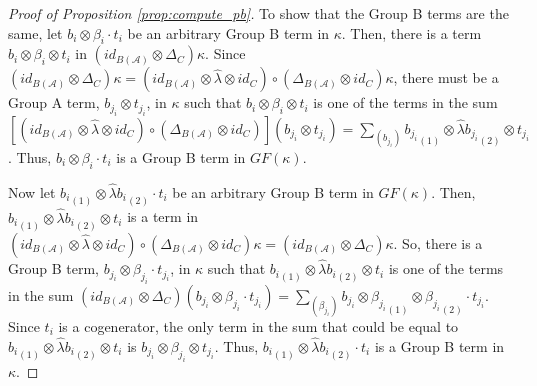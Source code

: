 \begin{proof}[Proof of Proposition \ref{prop:compute_pb}]
To show that the Group B terms 
are the same, let $b_i \otimes \beta_i \cdot t_i$ be 
an arbitrary Group B term in $\kappa$.
Then, there is a term $b_i \otimes \beta_i \otimes t_i$ 
in $(id_{B(\mathcal{A})} \otimes \Delta_{C}) \kappa$. Since 
$(id_{B(\mathcal{A})} \otimes \Delta_{C}) \kappa = 
(id_{B(\mathcal{A})} \otimes \hat{\lambda} \otimes id_C) \circ 
(\Delta_{B(\mathcal{A})} \otimes id_C) \kappa$, 
there must be a Group A term, $b_{j_i} \otimes t_{j_i}$, 
in $\kappa$ such that $b_i \otimes \beta_i \otimes t_i$ 
is one of the terms in the sum 
$[(id_{B(\mathcal{A})} \otimes \hat{\lambda} \otimes id_C) \circ 
(\Delta_{B(\mathcal{A})} \otimes id_C)] (b_{j_i} \otimes t_{j_i}) = 
\sum \limits_{(b_{j_i})} {b_{j_i}}_{(1)} \otimes 
\hat{\lambda} {b_{j_i}}_{(2)} \otimes t_{j_i}$. Thus, 
$b_i \otimes \beta_i \cdot t_i$ is a Group B term in 
$GF(\kappa)$. 

Now let ${b_i}_{(1)} \otimes \hat{\lambda} {b_i}_{(2)} 
\cdot t_i$ be an arbitrary Group B term in $GF(\kappa)$. 
Then, ${b_i}_{(1)} \otimes \hat{\lambda} {b_i}_{(2)} \otimes t_i$ 
is a term in 
$(id_{B(\mathcal{A})} \otimes \hat{\lambda} \otimes id_C) \circ 
(\Delta_{B(\mathcal{A})} \otimes id_C) \kappa = 
(id_{B(\mathcal{A})} \otimes \Delta_{C}) \kappa 
$. So, there is a Group B term, $b_{j_i} \otimes 
\beta_{j_i} \cdot t_{j_i}$, in $\kappa$ such that 
${b_i}_{(1)} \otimes \hat{\lambda} {b_i}_{(2)} 
\otimes t_i$ is one of the terms in the sum 
$(id_{B(\mathcal{A})} \otimes \Delta_{C}) 
(b_{j_i} \otimes \beta_{j_i} \cdot t_{j_i}) = 
\sum \limits_{(\beta_{j_i})}
b_{j_i} \otimes {\beta_{j_i}}_{(1)} 
\otimes {\beta_{j_i}}_{(2)} \cdot t_{j_i}$. 
Since $t_i$ is a cogenerator, the only term in the sum 
that could be equal to ${b_i}_{(1)} \otimes 
\hat{\lambda} {b_i}_{(2)} \otimes t_i$ is 
$b_{j_i} \otimes \beta_{j_i} \otimes t_{j_i}$. 
Thus, ${b_i}_{(1)} \otimes \hat{\lambda} {b_i}_{(2)} 
\cdot t_i$ is a Group B term in $\kappa$.
\end{proof}